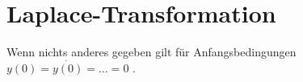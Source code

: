 \section{Laplace-Transformation}
Wenn nichts anderes gegeben gilt für Anfangsbedingungen $y(0) = \dot{y(0)} =  \ldots = 0$ .